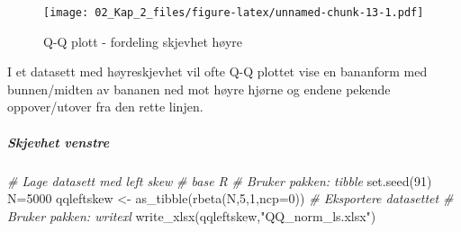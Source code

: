 \documentclass[
]{article}
\newenvironment{Shaded}{\begin{snugshade}}{\end{snugshade}}
\newcommand{\AttributeTok}[1]{\textcolor[rgb]{0.77,0.63,0.00}{#1}}
\newcommand{\CommentTok}[1]{\textcolor[rgb]{0.56,0.35,0.01}{\textit{#1}}}
\newcommand{\DecValTok}[1]{\textcolor[rgb]{0.00,0.00,0.81}{#1}}
\newcommand{\FunctionTok}[1]{\textcolor[rgb]{0.00,0.00,0.00}{#1}}
\newcommand{\NormalTok}[1]{#1}
\newcommand{\OtherTok}[1]{\textcolor[rgb]{0.56,0.35,0.01}{#1}}
\newcommand{\SpecialCharTok}[1]{\textcolor[rgb]{0.00,0.00,0.00}{#1}}
\newcommand{\StringTok}[1]{\textcolor[rgb]{0.31,0.60,0.02}{#1}}
\begin{document}
\begin{figure}
\centering
\texttt{[image: 02\_Kap\_2\_files/figure-latex/unnamed-chunk-13-1.pdf]}
\caption{\label{fig:unnamed-chunk-13}Q-Q plott - fordeling skjevhet høyre}
\end{figure}

I et datasett med høyreskjevhet vil ofte Q-Q plottet vise en bananform med bunnen/midten av bananen ned mot høyre hjørne og endene pekende oppover/utover fra den rette linjen.

\hypertarget{skjevhet-venstre}{%
\subparagraph{Skjevhet venstre}\label{skjevhet-venstre}}

\begin{Shaded}
\begin{Highlighting}[]
\CommentTok{\# Lage datasett med left skew}
\CommentTok{\# base R}
\CommentTok{\# Bruker pakken: tibble}
\FunctionTok{set.seed}\NormalTok{(}\DecValTok{91}\NormalTok{)}
\NormalTok{N}\OtherTok{=}\DecValTok{5000}
\NormalTok{qqleftskew }\OtherTok{\textless{}{-}} \FunctionTok{as\_tibble}\NormalTok{(}\FunctionTok{rbeta}\NormalTok{(N,}\DecValTok{5}\NormalTok{,}\DecValTok{1}\NormalTok{,}\AttributeTok{ncp=}\DecValTok{0}\NormalTok{))}
\CommentTok{\# Eksportere datasettet}
\CommentTok{\# Bruker pakken: writexl}
\FunctionTok{write\_xlsx}\NormalTok{(qqleftskew,}\StringTok{"QQ\_norm\_ls.xlsx"}\NormalTok{)}
\end{Highlighting}
\end{Shaded}

\begin{Shaded}
\end{Shaded}
\end{document}
